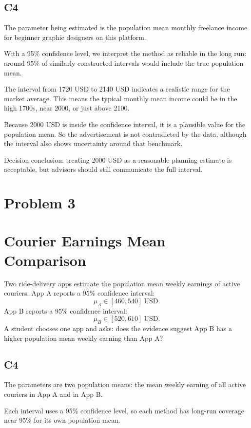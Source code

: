 \begin{ExamProblems}
		\subsection*{C4}
		The parameter being estimated is the population mean monthly freelance income for beginner graphic designers on this platform.

		With a 95\% confidence level, we interpret the method as reliable in the long run: around 95\% of similarly constructed intervals would include the true population mean.

		The interval from 1720 USD to 2140 USD indicates a realistic range for the market average.
		This means the typical monthly mean income could be in the high 1700s, near 2000, or just above 2100.

		Because 2000 USD is inside the confidence interval, it is a plausible value for the population mean.
		So the advertisement is not contradicted by the data, although the interval also shows uncertainty around that benchmark.

		Decision conclusion: treating 2000 USD as a reasonable planning estimate is acceptable, but advisors should still communicate the full interval.

		\newpage
		\item
		\section{Problem 3}
		\section{Courier Earnings Mean Comparison}
		Two ride-delivery apps estimate the population mean weekly earnings of active couriers.
		App A reports a 95\% confidence interval:
		\[
		\mu_A \in [460, 540]\ \text{USD}.
		\]
		App B reports a 95\% confidence interval:
		\[
		\mu_B \in [520, 610]\ \text{USD}.
		\]
		A student chooses one app and asks: does the evidence suggest App B has a higher population mean weekly earning than App A?

		\subsection*{C4}
		The parameters are two population means: the mean weekly earning of all active couriers in App A and in App B.

		Each interval uses a 95\% confidence level, so each method has long-run coverage near 95\% for its own population mean.


\end{ExamProblems}
